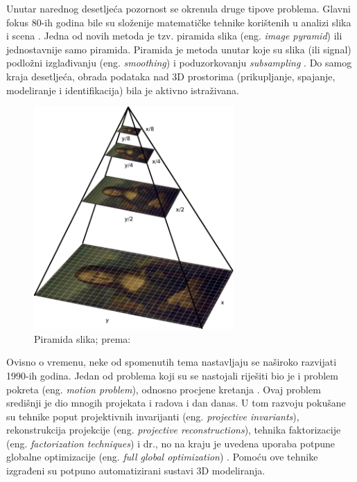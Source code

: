 \documentclass[]{foi} %
\begin{document}
Unutar narednog desetljeća pozornost se okrenula druge tipove problema. Glavni fokus 80-ih godina bile su složenije matematičke tehnike korištenih u analizi slika i scena \cite[str. 15]{szeliskicvaa}. Jedna od novih metoda je tzv. piramida slika (eng. \textit{image pyramid}) ili jednostavnije samo piramida. Piramida je metoda unutar koje su slika (ili signal) podložni izglađivanju (eng. \textit{smoothing}) i poduzorkovanju \textit{subsampling} \cite{wikipediaPiramida}. Do samog kraja desetljeća, obrada podataka nad 3D prostorima (prikupljanje, spajanje, modeliranje i identifikacija) bila je aktivno istraživana.

\begin{figure}[!hb]
    \centering
    \includegraphics[width=0.68\textwidth]{slike/piramidaslika.png}
    \caption{Piramida slika; prema: \cite{szeliskicvaa}}
    \label{fig:piramidaSlika}
\end{figure}

Ovisno o vremenu, neke od spomenutih tema nastavljaju se naširoko razvijati 1990-ih godina. Jedan od problema koji su se nastojali riješiti bio je i problem pokreta (eng. \textit{motion problem}), odnosno procjene kretanja \cite[str. 15]{szeliskicvaa}. Ovaj problem središnji je dio mnogih projekata i radova i dan danas. U tom razvoju pokušane su tehnike poput projektivnih invarijanti (eng. \textit{projective invariants}), rekonstrukcija projekcije (eng. \textit{projective reconstructions}), tehnika faktorizacije (eng. \textit{factorization techniques}) i dr., no na kraju je uvedena uporaba potpune globalne optimizacije (eng. \textit{full global optimization}) \cite[str. 15-18]{szeliskicvaa}. Pomoću ove tehnike izgrađeni su potpuno automatizirani sustavi 3D modeliranja.
\end{document}
